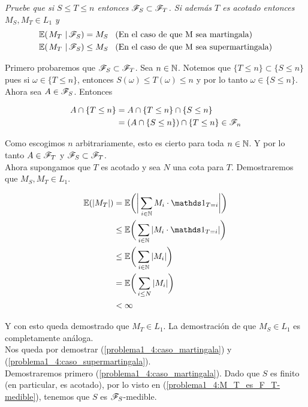 \emph{
	Pruebe que si $S\leq T\leq n$ entonces $\mathscr{F}_S\subset\mathscr{F}_T$. Si adem\'as $T$ es acotado entonces $M_S,M_T \in L_1$ y 
	\begin{align}
		\espc{M_T}{\F_S} = M_S &\mbox{\;\;\;(En el caso de que M sea martingala)} \label{problema1_4:caso_martingala}\\
		\espc{M_T}{\F_S}\leq M_S &\mbox{\;\;\;(En el caso de que M sea supermartingala)} \label{problema1_4:caso_supermartingala}
	\end{align}	
}

	Primero probaremos que $\mathscr{F}_S \subset \mathscr{F}_T$. Sea $n \in \mathbb{N}$. Notemos que $\{ T \leq n \} \subset \{ S \leq n \}$ pues
	si $\omega \in \{ T \leq n \}$, entonces $S(\omega) \leq T(\omega) \leq n $ y por lo tanto $\omega \in \{ S \leq n \}$.\\

	Ahora sea $A \in \mathscr{F}_S$. Entonces

	\begin{align}
		A \cap \{ T \leq n \} 	&=		A  \cap \{ T \leq n \} \cap \{ S \leq n \} \\
								&=		(A  \cap \{ S \leq n \}) \cap \{ T \leq n \} \in \mathscr{F}_n
	\end{align}

	Como escogimos $n$ arbitrariamente, esto es cierto para toda $n \in \mathbb{N}$. Y por lo tanto $A \in \mathscr{F}_T$ y $\mathscr{F}_S \subset \mathscr{F}_T$.\\

	Ahora supongamos que $T$ es acotado y sea $N$ una cota para $T$. Demostraremos que $M_S,M_T \in L_1$.
	
	\begin{align}
		\E(|M_T|) 	&=		\E\bigg(	\bigg| \sum_{i \in \N} M_i \cdot \indic_{T = i} \bigg|	\bigg) \\ 
					&\leq	\E\bigg(	\sum_{i \in \N} |M_i \cdot \indic_{T = i} |				\bigg) \\
					&\leq	\E\bigg(	\sum_{i \in \N} |M_i|									\bigg) \\
					&=		\E\bigg(	\sum_{i \leq N} |M_i|									\bigg) \\
					&< 		\infty
	\end{align}
	
	Y con esto queda demostrado que $M_T \in L_1$. La demostración de que $M_S \in L_1$ es completamente análoga.\\
	
	Nos queda por demostrar (\ref{problema1_4:caso_martingala}) y (\ref{problema1_4:caso_supermartingala}).\\
	
	Demostraremos primero (\ref{problema1_4:caso_martingala}). Dado que $S$ es finito (en particular, es acotado), por lo visto en
	(\ref{problema1_4:M_T_es_F_T-medible}), tenemos	que $S$ es $\mathscr{F}_S$-medible.
	
	